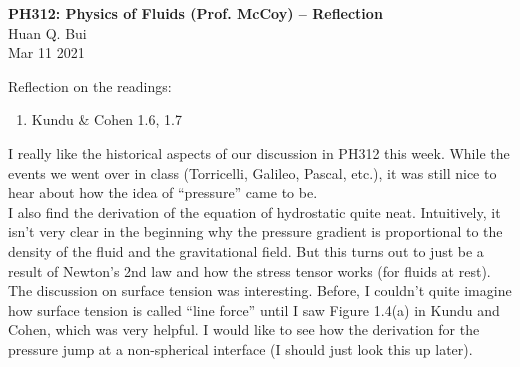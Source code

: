 \documentclass[11pt]{article}
\begin{document}
\begin{center}
{\large \bf PH312: Physics of Fluids (Prof. McCoy) -- Reflection}\\
{ Huan Q. Bui}\\
Mar 11 2021
\end{center}

\begin{framed}
	\noindent Reflection on the readings:
	\begin{enumerate}
		\item Kundu \& Cohen 1.6, 1.7
	\end{enumerate}
\end{framed}

\noindent I really like the historical aspects of our discussion in PH312 this week. While the events we went over in class (Torricelli, Galileo, Pascal, etc.), it was still nice to hear about how the idea of ``pressure'' came to be. \\

\noindent I also find the derivation of the equation of hydrostatic quite neat. Intuitively, it isn't very clear in the beginning why the pressure gradient is proportional to the density of the fluid and the gravitational field. But this turns out to just be a result of Newton's 2nd law and how the stress tensor works (for fluids at rest). \\

\noindent The discussion on surface tension was interesting. Before, I couldn't quite imagine how surface tension is called ``line force'' until I saw Figure 1.4(a) in Kundu and Cohen, which was very helpful. I would like to see how the derivation for the pressure jump at a non-spherical interface (I should just look this up later).  

  
\end{document}
